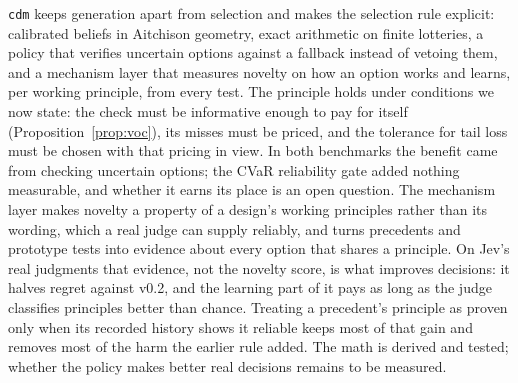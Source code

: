 \documentclass[11pt]{article}
\theoremstyle{definition}
\begin{document}
\texttt{cdm} keeps generation apart from selection and makes the selection rule explicit:
calibrated beliefs in Aitchison geometry, exact arithmetic on finite lotteries, a policy that
verifies uncertain options against a fallback instead of vetoing them, and a mechanism layer that
measures novelty on how an option works and learns, per working principle, from every test. The principle holds under
conditions we now state: the check must be informative enough to pay for itself
(Proposition~\ref{prop:voc}), its misses must be priced, and the tolerance for tail loss must be
chosen with that pricing in view. In both benchmarks the benefit came from checking uncertain
options; the CVaR reliability gate added nothing measurable, and whether it earns its place is an
open question. The mechanism layer makes novelty a property of a design's working principles
rather than its wording, which a real judge can supply reliably, and turns precedents and prototype
tests into evidence about every option that shares a principle. On Jev's real judgments that
evidence, not the novelty score, is what improves decisions: it halves regret against v0.2, and the
learning part of it pays as long as the judge classifies principles better than chance. Treating a
precedent's principle as proven only when its recorded history shows it reliable keeps most of
that gain and removes most of the harm the earlier rule added. The math is derived and
tested; whether the policy makes better real decisions remains to be measured.
\end{document}
